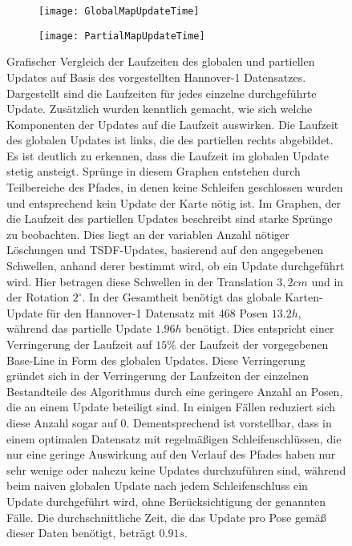 \begin{figure}
	\centering
	\begin{subfigure}{.5\textwidth}
		 \centering
  		 \texttt{[image: GlobalMapUpdateTime]}
  		 \centering \caption{}
  		 \label{fig:GlobalMapUpdateTime}
	\end{subfigure}%
	\begin{subfigure}{.5\textwidth}
    	\centering
  		\texttt{[image: PartialMapUpdateTime]}
  		\centering \caption{}
  		\label{fig:PartialMapUpdateTime}
	\end{subfigure}
	\caption{Grafischer Vergleich der Laufzeiten des globalen und partiellen Updates auf Basis des vorgestellten Hannover-1 Datensatzes. Dargestellt sind die Laufzeiten für jedes einzelne durchgeführte Update. Zusätzlich wurden kenntlich gemacht, wie sich welche Komponenten der Updates auf die Laufzeit auswirken. Die Laufzeit des globalen Updates ist links, die des partiellen rechts abgebildet. Es ist deutlich zu erkennen, dass die Laufzeit im globalen Update stetig ansteigt. Sprünge in diesem Graphen entstehen durch Teilbereiche des Pfades, in denen keine Schleifen geschlossen wurden und entsprechend kein Update der Karte nötig ist. Im Graphen, der die Laufzeit des partiellen Updates beschreibt sind starke Sprünge zu beobachten. Dies liegt an der variablen Anzahl nötiger Löschungen und TSDF-Updates, basierend auf den angegebenen Schwellen, anhand derer bestimmt wird, ob ein Update durchgeführt wird. Hier betragen diese Schwellen in der Translation $3,2 cm$ und in der Rotation $2^\circ$. In der Gesamtheit benötigt das globale Karten-Update für den Hannover-1 Datensatz mit $468$ Posen $13.2h$, während das partielle Update $1.96h$ benötigt. Dies entspricht einer Verringerung der Laufzeit auf $15\%$ der Laufzeit der vorgegebenen Base-Line in Form des globalen Updates. Diese Verringerung gründet sich in der Verringerung der Laufzeiten der einzelnen Bestandteile des Algorithmus durch eine geringere Anzahl an Posen, die an einem Update beteiligt sind. In einigen Fällen reduziert sich diese Anzahl sogar auf $0$. Dementsprechend ist vorstellbar, dass in einem optimalen Datensatz mit regelmäßigen Schleifenschlüssen, die nur eine geringe Auswirkung auf den Verlauf des Pfades haben nur sehr wenige oder nahezu keine Updates durchzuführen sind, während beim naiven globalen Update nach jedem Schleifenschluss ein Update durchgeführt wird, ohne Berücksichtigung der genannten Fälle. Die durchschnittliche Zeit, die das Update pro Pose gemäß dieser Daten benötigt, beträgt $0.91s$.}
	\label{fig:MapUpdateTimes}
\end{figure}
	
